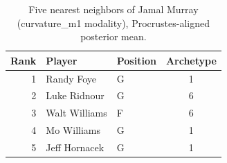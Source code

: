 \begin{table}[htbp]
  \centering\small
  \begin{tabular}{rllc}
    \toprule
    Rank & Player & Position & Archetype \\
    \midrule
    1 & Randy Foye & G & 1 \\
    2 & Luke Ridnour & G & 6 \\
    3 & Walt Williams & F & 6 \\
    4 & Mo Williams & G & 1 \\
    5 & Jeff Hornacek & G & 1 \\
    \bottomrule
  \end{tabular}
  \caption{Five nearest neighbors of Jamal Murray (curvature_m1 modality), Procrustes-aligned posterior mean.}
  \label{tab:Jamal_Murray_neighbors_curvature_m1}
\end{table}


